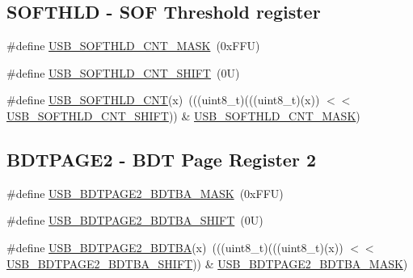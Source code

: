 \subsection*{S\+O\+F\+T\+H\+LD -\/ S\+OF Threshold register}
\begin{DoxyCompactItemize}
\item 
\#define \mbox{\hyperlink{group___u_s_b___register___masks_gab71f8a7be8b025453facbce8d45b7bcc}{U\+S\+B\+\_\+\+S\+O\+F\+T\+H\+L\+D\+\_\+\+C\+N\+T\+\_\+\+M\+A\+SK}}~(0x\+F\+F\+U)
\item 
\#define \mbox{\hyperlink{group___u_s_b___register___masks_gaf4b663b6276ba642abfdedf79fac92c6}{U\+S\+B\+\_\+\+S\+O\+F\+T\+H\+L\+D\+\_\+\+C\+N\+T\+\_\+\+S\+H\+I\+FT}}~(0\+U)
\item 
\#define \mbox{\hyperlink{group___u_s_b___register___masks_ga6a373b5dfe5c4aa910fd120cc169a4b9}{U\+S\+B\+\_\+\+S\+O\+F\+T\+H\+L\+D\+\_\+\+C\+NT}}(x)~(((uint8\+\_\+t)(((uint8\+\_\+t)(x)) $<$$<$ \mbox{\hyperlink{group___u_s_b___register___masks_gaf4b663b6276ba642abfdedf79fac92c6}{U\+S\+B\+\_\+\+S\+O\+F\+T\+H\+L\+D\+\_\+\+C\+N\+T\+\_\+\+S\+H\+I\+FT}})) \& \mbox{\hyperlink{group___u_s_b___register___masks_gab71f8a7be8b025453facbce8d45b7bcc}{U\+S\+B\+\_\+\+S\+O\+F\+T\+H\+L\+D\+\_\+\+C\+N\+T\+\_\+\+M\+A\+SK}})
\end{DoxyCompactItemize}
\subsection*{B\+D\+T\+P\+A\+G\+E2 -\/ B\+DT Page Register 2}
\begin{DoxyCompactItemize}
\item 
\#define \mbox{\hyperlink{group___u_s_b___register___masks_ga69407c90a73a26bc60f3f9b75e4bd7c0}{U\+S\+B\+\_\+\+B\+D\+T\+P\+A\+G\+E2\+\_\+\+B\+D\+T\+B\+A\+\_\+\+M\+A\+SK}}~(0x\+F\+F\+U)
\item 
\#define \mbox{\hyperlink{group___u_s_b___register___masks_gae67d0252b1559f854264f0fe52ff6fb5}{U\+S\+B\+\_\+\+B\+D\+T\+P\+A\+G\+E2\+\_\+\+B\+D\+T\+B\+A\+\_\+\+S\+H\+I\+FT}}~(0\+U)
\item 
\#define \mbox{\hyperlink{group___u_s_b___register___masks_ga1b7b12b3e6686e4b15b1cfa072a805eb}{U\+S\+B\+\_\+\+B\+D\+T\+P\+A\+G\+E2\+\_\+\+B\+D\+T\+BA}}(x)~(((uint8\+\_\+t)(((uint8\+\_\+t)(x)) $<$$<$ \mbox{\hyperlink{group___u_s_b___register___masks_gae67d0252b1559f854264f0fe52ff6fb5}{U\+S\+B\+\_\+\+B\+D\+T\+P\+A\+G\+E2\+\_\+\+B\+D\+T\+B\+A\+\_\+\+S\+H\+I\+FT}})) \& \mbox{\hyperlink{group___u_s_b___register___masks_ga69407c90a73a26bc60f3f9b75e4bd7c0}{U\+S\+B\+\_\+\+B\+D\+T\+P\+A\+G\+E2\+\_\+\+B\+D\+T\+B\+A\+\_\+\+M\+A\+SK}})
\end{DoxyCompactItemize}
